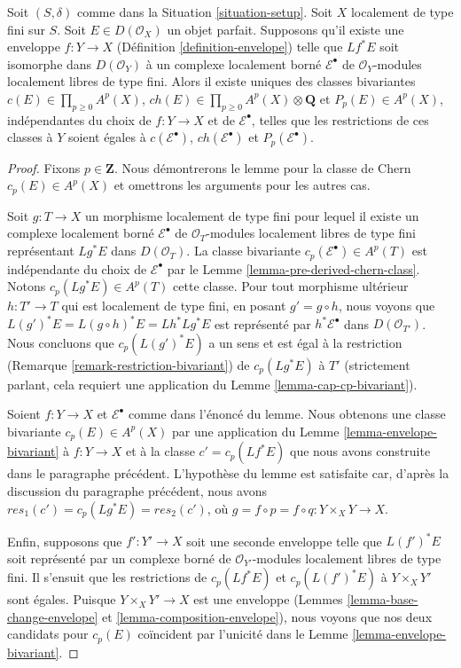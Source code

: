 \begin{lemma}
\label{lemma-defined-by-envelope}
Soit $(S, \delta)$ comme dans la Situation \ref{situation-setup}.
Soit $X$ localement de type fini sur $S$. Soit $E \in D(\mathcal{O}_X)$
un objet parfait. Supposons qu'il existe une enveloppe
$f : Y \to X$ (Définition \ref{definition-envelope})
telle que $Lf^*E$ soit isomorphe dans $D(\mathcal{O}_Y)$
à un complexe localement borné $\mathcal{E}^\bullet$ de
$\mathcal{O}_Y$-modules localement libres de type fini. Alors il existe uniques des classes bivariantes
$c(E) \in \prod_{p \geq 0} A^p(X)$,
$ch(E) \in \prod_{p \geq 0} A^p(X) \otimes \mathbf{Q}$ et
$P_p(E) \in A^p(X)$, indépendantes du choix de $f : Y \to X$
et de $\mathcal{E}^\bullet$, telles que les restrictions de ces classes
à $Y$ soient égales à $c(\mathcal{E}^\bullet)$,
$ch(\mathcal{E}^\bullet)$ et $P_p(\mathcal{E}^\bullet)$.
\end{lemma}

\begin{proof}
Fixons $p \in \mathbf{Z}$. Nous démontrerons le lemme pour la classe
de Chern $c_p(E) \in A^p(X)$ et omettrons les arguments pour les autres cas.

\medskip\noindent
Soit $g : T \to X$ un morphisme localement de type fini pour lequel
il existe un complexe localement borné $\mathcal{E}^\bullet$ de
$\mathcal{O}_T$-modules localement libres de type fini représentant $Lg^*E$ dans $D(\mathcal{O}_T)$.
La classe bivariante $c_p(\mathcal{E}^\bullet) \in A^p(T)$
est indépendante du choix de $\mathcal{E}^\bullet$ par le
Lemme \ref{lemma-pre-derived-chern-class}.
Notons $c_p(Lg^*E) \in A^p(T)$ cette classe.
Pour tout morphisme ultérieur $h : T' \to T$ qui est localement
de type fini, en posant $g' = g \circ h$, nous voyons que
$L(g')^*E = L(g \circ h)^*E = Lh^*Lg^*E$ est représenté par
$h^*\mathcal{E}^\bullet$ dans $D(\mathcal{O}_{T'})$.
Nous concluons que $c_p(L(g')^*E)$ a un sens et est égal à la
restriction (Remarque \ref{remark-restriction-bivariant})
de $c_p(Lg^*E)$ à $T'$ (strictement parlant, cela requiert une application du
Lemme \ref{lemma-cap-cp-bivariant}).

\medskip\noindent
Soient $f : Y \to X$ et $\mathcal{E}^\bullet$ comme dans l'énoncé
du lemme. Nous obtenons une classe bivariante $c_p(E) \in A^p(X)$ par
une application du Lemme \ref{lemma-envelope-bivariant}
à $f : Y \to X$ et à la classe $c' = c_p(Lf^*E)$ que nous avons construite
dans le paragraphe précédent. L'hypothèse du lemme est
satisfaite car, d'après la discussion du paragraphe précédent, nous avons
$res_1(c') = c_p(Lg^*E) = res_2(c')$, où
$g = f \circ p = f \circ q : Y \times_X Y \to X$.

\medskip\noindent
Enfin, supposons que $f' : Y' \to X$ soit une seconde enveloppe
telle que $L(f')^*E$ soit représenté par un complexe borné de
$\mathcal{O}_{Y'}$-modules localement libres de type fini. Il s'ensuit
que les restrictions de $c_p(Lf^*E)$ et $c_p(L(f')^*E)$
à $Y \times_X Y'$ sont égales. Puisque $Y \times_X Y' \to X$
est une enveloppe (Lemmes \ref{lemma-base-change-envelope} et
\ref{lemma-composition-envelope}), nous voyons que nos deux candidats pour $c_p(E)$
coïncident par l'unicité dans le Lemme \ref{lemma-envelope-bivariant}.
\end{proof}


